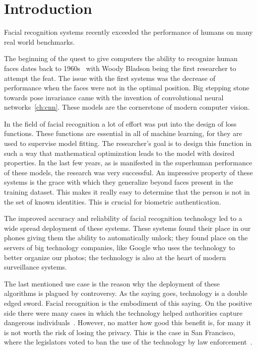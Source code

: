 \chapter{Introduction}\label{ch:introduction}
Facial recognition systems recently exceeded the performance of humans on many real world benchmarks.

The beginning of the quest to give computers the ability to recognize human faces dates back to 1960s~\cite{History}
with Woody Bladson being the first researcher to attempt the feat.
The issue with the first systems was the decrease of performance when the faces were not in the optimal position.
Big stepping stone towards pose invariance came with the invention of convolutional neural networks~\ref{ch:cnn}.
These models are the cornerstone of modern computer vision.

In the field of facial recognition a lot of effort was put into the design of loss functions.
These functions are essential in all of machine learning, for they are used to supervise model fitting.
The researcher's goal is to design this function in such a way that mathematical optimization leads to the model
with desired properties.
In the last few years, as is manifested in the superhuman performance of these models, the research was very successful.
An impressive property of these systems is the grace with which they generalize beyond faces present in the training
dataset.
This makes it really easy to determine that the person is not in the set of known identities.
This is crucial for biometric authentication.

The improved accuracy and reliability of facial recognition technology led to a wide spread deployment of these systems.
These systems found their place in our phones giving them the ability to automatically unlock;
they found place on the servers of big technology companies, like Google who uses the technology to better organize
our photos;
the technology is also at the heart of modern surveillance systems.

The last mentioned use case is the reason why the deployment of these algorithms is plagued by controversy.
As the saying goes, technology is a double edged sword.
Facial recognition is the embodiment of this saying.
On the positive side there were many cases in which the technology helped authorities capture dangerous
individuals~\cite{FacRecCon}.
However, no matter how good this benefit is, for many it is not worth the risk of losing the privacy.
This is the case in San Francisco, where the legislators voted to ban the use of the technology by
law enforcement~\cite{FacRecSan}.


